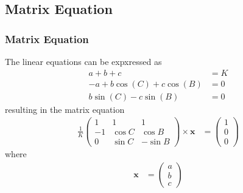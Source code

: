 \documentclass{beamer}
\theoremstyle{remark}
\newcommand{\myvec}[1]{\ensuremath{\begin{pmatrix}#1\end{pmatrix}}}
\let\vec\mathbf
\numberwithin{equation}{section}
\begin{document}
\subsection{Matrix Equation}
\begin{frame}
\frametitle{Matrix Equation}
The linear equations can be expxressed as
\begin{align}
a+b+c&=K\\
-a+b\cos(C)+c\cos(B)&=0\\
b\sin(C)-c\sin(B)&=0
\end{align}
%
resulting in the matrix equation
\begin{align}
\label{eq:equation}
  \frac{1}{K}\myvec{1 & 1 & 1\\-1 & \cos{C} & \cos{B}\\0 & \sin{C} & -\sin{B}}\times\vec{x}&=\myvec{1\\0\\0}
\end{align}
where
\begin{align}
\vec{x} &= \myvec{a\\b\\c}
\end{align}
\end{frame}
\end{document}
